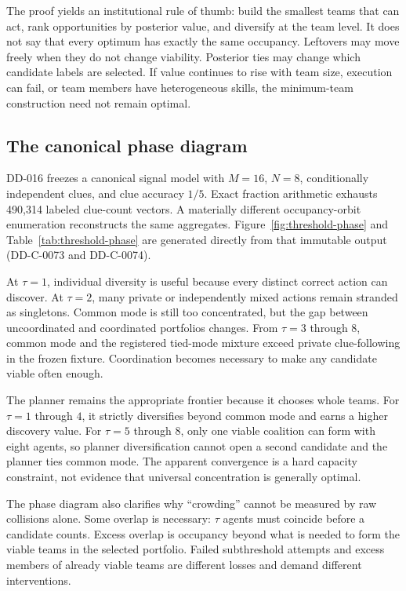 \documentclass[11pt]{article}
\begin{document}
The proof yields an institutional rule of thumb: build the smallest teams that
can act, rank opportunities by posterior value, and diversify at the team
level. It does not say that every optimum has exactly the same occupancy.
Leftovers may move freely when they do not change viability. Posterior ties may
change which candidate labels are selected. If value continues to rise with
team size, execution can fail, or team members have heterogeneous skills, the
minimum-team construction need not remain optimal.

\subsection{The canonical phase diagram}

DD-016 freezes a canonical signal model with $M=16$, $N=8$, conditionally
independent clues, and clue accuracy $1/5$. Exact fraction arithmetic exhausts
490,314 labeled clue-count vectors. A materially different occupancy-orbit
enumeration reconstructs the same aggregates. Figure~\ref{fig:threshold-phase}
and Table~\ref{tab:threshold-phase} are generated directly from that immutable
output (DD-C-0073 and DD-C-0074).



At $\tau=1$, individual diversity is useful because every distinct correct
action can discover. At $\tau=2$, many private or independently mixed actions
remain stranded as singletons. Common mode is still too concentrated, but the
gap between uncoordinated and coordinated portfolios changes. From $\tau=3$
through $8$, common mode and the registered tied-mode mixture exceed private
clue-following in the frozen fixture. Coordination becomes necessary to make
any candidate viable often enough.

The planner remains the appropriate frontier because it chooses whole teams.
For $\tau=1$ through $4$, it strictly diversifies beyond common mode and earns a
higher discovery value. For $\tau=5$ through $8$, only one viable coalition can
form with eight agents, so planner diversification cannot open a second
candidate and the planner ties common mode. The apparent convergence is a hard
capacity constraint, not evidence that universal concentration is generally
optimal.



The phase diagram also clarifies why ``crowding'' cannot be measured by raw
collisions alone. Some overlap is necessary: $\tau$ agents must coincide before
a candidate counts. Excess overlap is occupancy beyond what is needed to form
the viable teams in the selected portfolio. Failed subthreshold attempts and
excess members of already viable teams are different losses and demand
different interventions.
\end{document}
